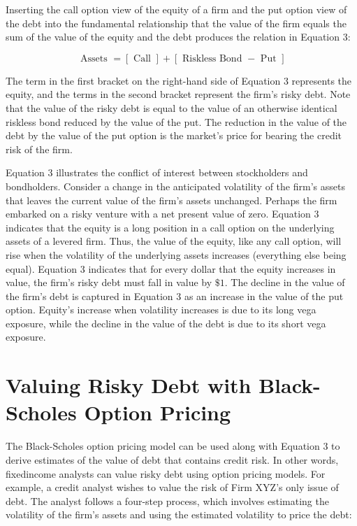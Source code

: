 \documentclass[11pt]{article}
\begin{document}
Inserting the call option view of the equity of a firm and the put option view of the debt into the fundamental relationship that the value of the firm equals the sum of the value of the equity and the debt produces the relation in Equation 3:


\begin{equation*}
\text { Assets }=[\text { Call }]+[\text { Riskless Bond }- \text { Put }] \tag{3}
\end{equation*}


The term in the first bracket on the right-hand side of Equation 3 represents the equity, and the terms in the second bracket represent the firm's risky debt. Note that the value of the risky debt is equal to the value of an otherwise identical riskless bond reduced by the value of the put. The reduction in the value of the debt by the value of the put option is the market's price for bearing the credit risk of the firm.

Equation 3 illustrates the conflict of interest between stockholders and bondholders. Consider a change in the anticipated volatility of the firm's assets that leaves the current value of the firm's assets unchanged. Perhaps the firm embarked on a risky venture with a net present value of zero. Equation 3 indicates that the equity is a long position in a call option on the underlying assets of a levered firm. Thus, the value of the equity, like any call option, will rise when the volatility of the underlying assets increases (everything else being equal). Equation 3 indicates that for every dollar that the equity increases in value, the firm's risky debt must fall in value by $\$ 1$. The decline in the value of the firm's debt is captured in Equation 3 as an increase in the value of the put option. Equity's increase when volatility increases is due to its long vega exposure, while the decline in the value of the debt is due to its short vega exposure.

\section*{Valuing Risky Debt with Black-Scholes Option Pricing}
The Black-Scholes option pricing model can be used along with Equation 3 to derive estimates of the value of debt that contains credit risk. In other words, fixedincome analysts can value risky debt using option pricing models. For example, a credit analyst wishes to value the risk of Firm XYZ's only issue of debt. The analyst follows a four-step process, which involves estimating the volatility of the firm's assets and using the estimated volatility to price the debt:
\end{document}
